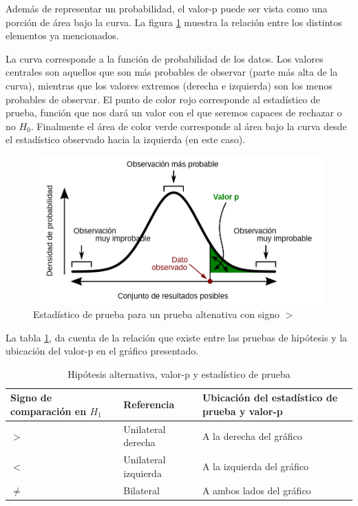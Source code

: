 \documentclass[
]{book}
\theoremstyle{definition}
\theoremstyle{definition}
\theoremstyle{definition}
\theoremstyle{definition}
\theoremstyle{remark}
\begin{document}
Además de representar un probabilidad, el valor-p puede ser vista como una porción de área bajo la curva. La figura \ref{fig:graficovalorp} muestra la relación entre los distintos elementos ya mencionados.

La curva corresponde a la función de probabilidad de los datos. Los valores centrales son aquellos que son más probables de observar (parte más alta de la curva), mientras que los valores extremos (derecha e izquierda) son los menos probables de observar. El punto de color rojo corresponde al estadístico de prueba, función que nos dará un valor con el que seremos capaces de rechazar o no \(H_0\). Finalmente el área de color verde corresponde al área bajo la curva desde el estadístico observado hacia la izquierda (en este caso).

\begin{figure}

{\centering \includegraphics[width=0.7\linewidth]{img/Valor_p} 

}

\caption{Estadístico de prueba para un prueba altenativa con signo $>$}\label{fig:graficovalorp}
\end{figure}

La tabla \ref{tab:regiones}, da cuenta de la relación que existe entre las pruebas de hipótesis y la ubicación del valor-p en el gráfico presentado.

\begin{table}[H]

\caption{\label{tab:regiones}Hipótesis alternativa, valor-p y estadístico de prueba}
\centering
\begin{tabular}[t]{>{\centering\arraybackslash}p{4cm}>{\centering\arraybackslash}p{4cm}>{\centering\arraybackslash}p{5cm}}
\toprule
Signo de comparación en $H_1$ & Referencia & Ubicación del estadístico de prueba y valor-p\\
\midrule
$>$ & Unilateral derecha & A la derecha del gráfico\\
$<$ & Unilateral izquierda & A la izquierda del gráfico\\
$\neq$ & Bilateral & A ambos lados del gráfico\\
\bottomrule
\end{tabular}
\end{table}
\end{document}
